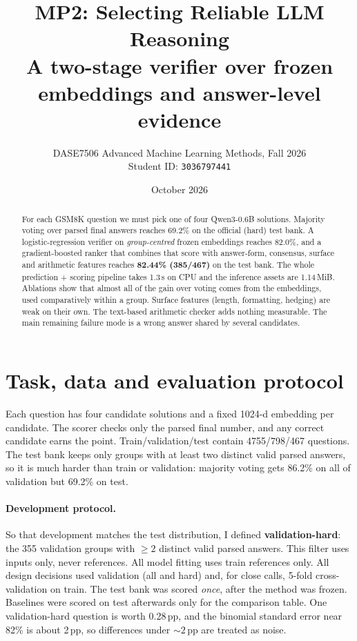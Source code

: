 \documentclass[10pt,a4paper]{article}
\title{\textbf{MP2: Selecting Reliable LLM Reasoning}\\[2pt]\large A two-stage verifier over frozen embeddings and answer-level evidence}
\author{DASE7506 Advanced Machine Learning Methods, Fall 2026 \\ Student ID: \texttt{3036797441}}
\date{October 2026}
\begin{document}
\maketitle

\begin{abstract}
For each GSM8K question we must pick one of four Qwen3-0.6B solutions. Majority voting over parsed final answers reaches 69.2\% on the official (hard) test bank. A logistic-regression verifier on \emph{group-centred} frozen embeddings reaches 82.0\%, and a gradient-boosted ranker that combines that score with answer-form, consensus, surface and arithmetic features reaches \textbf{82.44\% (385/467)} on the test bank. The whole prediction + scoring pipeline takes 1.3\,s on CPU and the inference assets are 1.14\,MiB. Ablations show that almost all of the gain over voting comes from the embeddings, used comparatively within a group. Surface features (length, formatting, hedging) are weak on their own. The text-based arithmetic checker adds nothing measurable. The main remaining failure mode is a wrong answer shared by several candidates.
\end{abstract}

\section{Task, data and evaluation protocol}
Each question has four candidate solutions and a fixed 1024-d embedding per candidate. The scorer checks only the parsed final number, and any correct candidate earns the point. Train/validation/test contain 4755/798/467 questions. The test bank keeps only groups with at least two distinct valid parsed answers, so it is much harder than train or validation: majority voting gets 86.2\% on all of validation but 69.2\% on test.

\paragraph{Development protocol.} So that development matches the test distribution, I defined \textbf{validation-hard}: the 355 validation groups with $\ge 2$ distinct valid parsed answers. This filter uses inputs only, never references. All model fitting uses train references only. All design decisions used validation (all and hard) and, for close calls, 5-fold cross-validation on train. The test bank was scored \emph{once}, after the method was frozen. Baselines were scored on test afterwards only for the comparison table. One validation-hard question is worth 0.28\,pp, and the binomial standard error near 82\% is about 2\,pp, so differences under ${\sim}2$\,pp are treated as noise.
\end{document}
